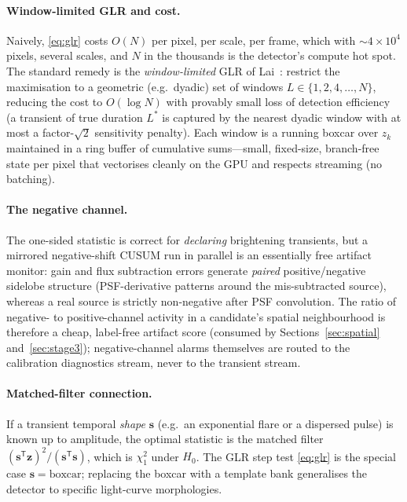 \documentclass[11pt]{article}
\newcommand{\T}{^{\mathsf{T}}}
\begin{document}
\paragraph{Window-limited GLR and cost.} Naively, \eqref{eq:glr} costs $O(N)$ per pixel, per
scale, per frame, which with $\sim\!4\times10^4$ pixels, several scales, and $N$ in the thousands is
the detector's compute hot spot. The standard remedy is the \emph{window-limited} GLR of
Lai~\cite{lai}: restrict the maximisation to a geometric (e.g.\ dyadic) set of windows
$L\in\{1,2,4,\dots,N\}$, reducing the cost to $O(\log N)$ with provably small loss of detection
efficiency (a transient of true duration $L^\ast$ is captured by the nearest dyadic window with at
most a factor-$\sqrt2$ sensitivity penalty). Each window is a running boxcar over $z_k$ maintained
in a ring buffer of cumulative sums---small, fixed-size, branch-free state per pixel that
vectorises cleanly on the GPU and respects streaming (no batching).

\paragraph{The negative channel.} The one-sided statistic is correct for \emph{declaring}
brightening transients, but a mirrored negative-shift CUSUM run in parallel is an essentially free
artifact monitor: gain and flux subtraction errors generate \emph{paired} positive/negative
sidelobe structure (PSF-derivative patterns around the mis-subtracted source), whereas a real
source is strictly non-negative after PSF convolution. The ratio of negative- to positive-channel
activity in a candidate's spatial neighbourhood is therefore a cheap, label-free artifact score
(consumed by Sections~\ref{sec:spatial} and~\ref{sec:stage3}); negative-channel alarms themselves
are routed to the calibration diagnostics stream, never to the transient stream.

\paragraph{Matched-filter connection.}
If a transient temporal \emph{shape} $\bm{s}$ (e.g.\ an exponential flare or a
dispersed pulse) is known up to amplitude, the optimal statistic is the matched filter
$(\bm{s}\T\bm{z})^2/(\bm{s}\T\bm{s})$, which is $\chi^2_1$ under $H_0$. The GLR step
test \eqref{eq:glr} is the special case $\bm{s}=\text{boxcar}$; replacing the boxcar
with a template bank generalises the detector to specific light-curve morphologies.
\end{document}

